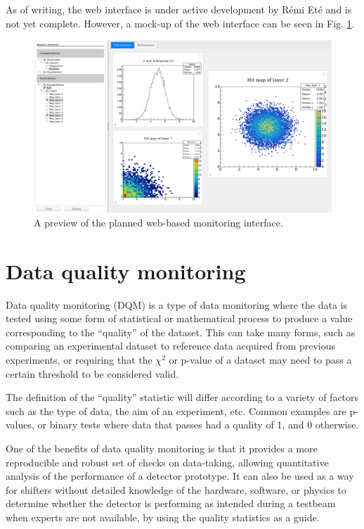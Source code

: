 As of writing, the web interface is under active development by R\'{e}mi Et\'{e} and is not yet complete. However, a mock-up of the web interface can be seen in Fig. \ref{figure:daq/dqm4hep/future-gui}.

\begin{figure}[h]
	\centering
	\includegraphics[width=1.0\textwidth]{../Pictures/ScreenshotWebMonitoring.png}
	\caption{A preview of the planned web-based monitoring interface.}
	\label{figure:daq/dqm4hep/future-gui}
\end{figure}

\section{Data quality monitoring}
Data quality monitoring (\acrshort{DQM}) is a type of data monitoring where the data is tested using some form of statistical or mathematical process to produce a value corresponding to the ``quality'' of the dataset. This can take many forms, such as comparing an experimental dataset to reference data acquired from previous experiments, or requiring that the $\chi^2$ or p-value of a dataset may need to pass a certain threshold to be considered valid.

The definition of the ``quality'' statistic will differ according to a variety of factors such as the type of data, the aim of an experiment, etc. Common examples are p-values, or binary tests where data that passes had a quality of 1, and 0 otherwise.

One of the benefits of data quality monitoring is that it provides a more reproducible and robust set of checks on data-taking, allowing quantitative analysis of the performance of a detector prototype. It can also be used as a way for shifters without detailed knowledge of the hardware, software, or physics to determine whether the detector is performing as intended during a testbeam when experts are not available, by using the quality statistics as a guide.

